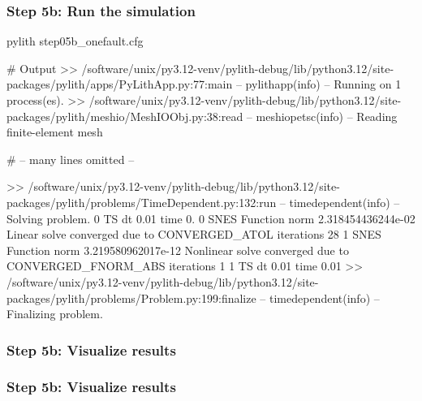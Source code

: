 \documentclass[aspectratio=169]{beamer}
\begin{document}
\begin{frame}[fragile]
  \frametitle{Step 5b: Run the simulation}
  \summary{}

\begin{bashcode}
pylith step05b_onefault.cfg

# Output
 >> /software/unix/py3.12-venv/pylith-debug/lib/python3.12/site-packages/pylith/apps/PyLithApp.py:77:main
 -- pylithapp(info)
 -- Running on 1 process(es).
 >> /software/unix/py3.12-venv/pylith-debug/lib/python3.12/site-packages/pylith/meshio/MeshIOObj.py:38:read
 -- meshiopetsc(info)
 -- Reading finite-element mesh

# -- many lines omitted --

 >> /software/unix/py3.12-venv/pylith-debug/lib/python3.12/site-packages/pylith/problems/TimeDependent.py:132:run
 -- timedependent(info)
 -- Solving problem.
0 TS dt 0.01 time 0.
    0 SNES Function norm 2.318454436244e-02
      Linear solve converged due to CONVERGED_ATOL iterations 28
    1 SNES Function norm 3.219580962017e-12
    Nonlinear solve converged due to CONVERGED_FNORM_ABS iterations 1
1 TS dt 0.01 time 0.01
 >> /software/unix/py3.12-venv/pylith-debug/lib/python3.12/site-packages/pylith/problems/Problem.py:199:finalize
 -- timedependent(info)
 -- Finalizing problem.
\end{bashcode}
  
\end{frame}


\begin{frame}
  \frametitle{Step 5b: Visualize results}

    
\end{frame}


\begin{frame}
  \frametitle{Step 5b: Visualize results}

    
\end{frame}
\end{document}

